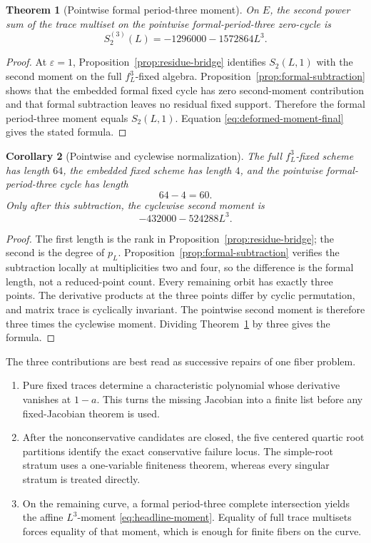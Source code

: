 \documentclass[11pt]{article}
\newtheorem{theorem}{Theorem}[section]
\newtheorem{corollary}[theorem]{Corollary}
\theoremstyle{definition}
\begin{document}
{\begin{theorem}[Pointwise formal period-three moment]
\label{thm:period-three-moment}
On $E$, the second power sum of the trace multiset on the pointwise formal-period-three zero-cycle is
\[
S_2^{(3)}(L)=-1296000-1572864L^3.
\]
\end{theorem}

\begin{proof}
At $\varepsilon=1$, Proposition~\ref{prop:residue-bridge} identifies $S_2(L,1)$ with the second moment on the full $f_L^3$-fixed algebra. Proposition~\ref{prop:formal-subtraction} shows that the embedded formal fixed cycle has zero second-moment contribution and that formal subtraction leaves no residual fixed support. Therefore the formal period-three moment equals $S_2(L,1)$. Equation \eqref{eq:deformed-moment-final} gives the stated formula.
\end{proof}

\begin{corollary}[Pointwise and cyclewise normalization]
\label{cor:length-sixty}
The full $f_L^3$-fixed scheme has length $64$, the embedded fixed scheme has length $4$, and the pointwise formal-period-three cycle has length
\[
64-4=60.
\]
Only after this subtraction, the cyclewise second moment is
\[
-432000-524288L^3.
\]
\end{corollary}

\begin{proof}
The first length is the rank in Proposition~\ref{prop:residue-bridge}; the second is the degree of $p_L$. Proposition~\ref{prop:formal-subtraction} verifies the subtraction locally at multiplicities two and four, so the difference is the formal length, not a reduced-point count. Every remaining orbit has exactly three points. The derivative products at the three points differ by cyclic permutation, and matrix trace is cyclically invariant. The pointwise second moment is therefore three times the cyclewise moment. Dividing Theorem~\ref{thm:period-three-moment} by three gives the formula.
\end{proof}
}

The three contributions are best read as successive repairs of one fiber problem.
\begin{enumerate}[leftmargin=2.2em]
\item Pure fixed traces determine a characteristic polynomial whose derivative vanishes at $1-a$. This turns the missing Jacobian into a finite list before any fixed-Jacobian theorem is used.
\item After the nonconservative candidates are closed, the five centered quartic root partitions identify the exact conservative failure locus. The simple-root stratum uses a one-variable finiteness theorem, whereas every singular stratum is treated directly.
\item On the remaining curve, a formal period-three complete intersection yields the affine $L^3$-moment \eqref{eq:headline-moment}. Equality of full trace multisets forces equality of that moment, which is enough for finite fibers on the curve.
\end{enumerate}
\end{document}
